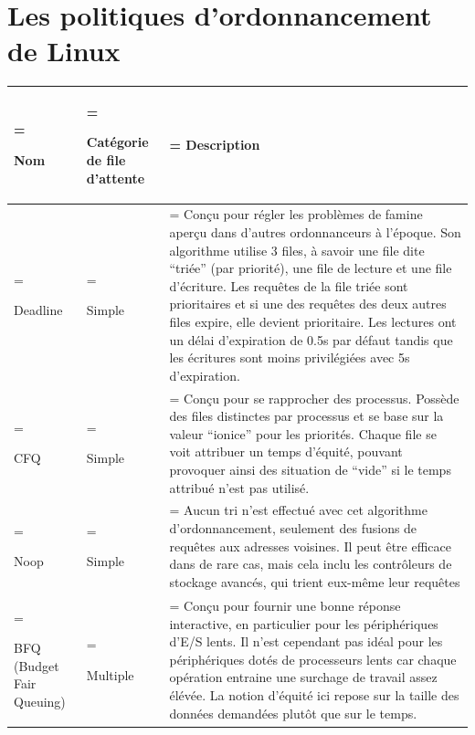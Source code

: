 \newpage
\section*{Les politiques d'ordonnancement de Linux}
\begin{table}[h!t]
    \begin{tabularx}{\textwidth} { 
        | >{\hsize=0.22\hsize\linewidth=\hsize\raggedright\arraybackslash}X 
        | >{\hsize=0.26\hsize\linewidth=\hsize\raggedright\arraybackslash}X 
        | >{\hsize=1.51\hsize\linewidth=\hsize\arraybackslash}X | }
        \hline
        \textbf{Nom} & \textbf{Catégorie de file d'attente} & \textbf
        {Description} \\
        \hline
        \hline
        Deadline & Simple & Conçu pour régler les problèmes de famine aperçu 
        dans d'autres ordonnanceurs à l'époque. Son algorithme utilise 3 files, 
        à savoir une file dite ``triée'' (par priorité), une file de lecture et 
        une file d'écriture. Les requêtes de la file triée sont prioritaires et 
        si une des requêtes des deux autres files expire, elle devient 
        prioritaire. Les lectures ont un délai d'expiration de 0.5s par défaut 
        tandis que les écritures sont moins privilégiées avec 5s d'expiration. 
        \\
        \hline
        CFQ & Simple & Conçu pour se rapprocher des processus. Possède des 
        files distinctes par processus et se base sur la valeur ``ionice'' pour 
        les priorités. Chaque file se voit attribuer un temps d'équité, pouvant 
        provoquer ainsi des situation de ``vide'' si le temps attribué n'est 
        pas utilisé. \\
        \hline
        Noop & Simple & Aucun tri n'est effectué avec cet algorithme 
        d'ordonnancement, seulement des fusions de requêtes aux adresses 
        voisines. Il peut être efficace dans de rare cas, mais cela inclu les 
        contrôleurs de stockage avancés, qui trient eux-même leur requêtes \\
        \hline
        BFQ (Budget Fair Queuing) & Multiple & Conçu pour fournir une bonne 
        réponse interactive, en particulier pour les périphériques d'E/S lents. 
        Il n'est cependant pas idéal pour les périphériques dotés de 
        processeurs lents car chaque opération entraine une surchage de travail 
        assez élévée. La notion d'équité ici repose sur la taille des données 
        demandées plutôt que sur le temps. \\

\end{tabularx}
\end{table}

